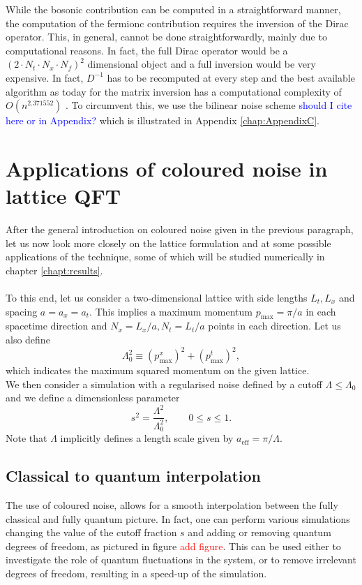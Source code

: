 While the bosonic contribution can be computed in a straightforward manner, the computation of the fermionc contribution requires the inversion of the Dirac operator. This, in general, cannot be done straightforwardly, mainly due to computational reasons.
In fact, the full Dirac operator would be a $(2 \cdot N_t \cdot N_x \cdot N_f)^2$ dimensional object and a full inversion would be very expensive. In fact, $D^{-1}$ has to be recomputed at every step and the best available algorithm as today for the matrix inversion has a computational complexity of $O(n^{2.371552})$ \cite{williams2023new}. To circumvent this, we use the bilinear noise scheme \cite{bilinearnoise1,bilinearnoise2} \textcolor{blue}{should I cite here or in Appendix?} which is illustrated in Appendix \ref{chap:AppendixC}.

\newpage


\section{Applications of coloured noise in lattice QFT}
\label{sec:lattice_with_coloured_noise}
After the general introduction on coloured noise given in the previous paragraph, let us now look more closely on the lattice formulation and at some possible applications of the technique, some of which will be studied numerically in chapter \ref{chapt:results}. \\~\\
To this end, let us consider a two-dimensional lattice with side lengths $L_t, L_x$ and spacing $a = a_x = a_t$. This implies a maximum momentum $p_\text{max} = \pi / a$ in each spacetime direction and $N_x=L_x/a, N_t=L_t/a$ points in each direction. Let us also define 
\begin{equation}
	\Lambda_0^2 \equiv (p^x_\text{max})^2 + (p^t_\text{max})^2,
\end{equation}
which indicates the maximum squared momentum on the given lattice. \\
We then consider a simulation with a regularised noise defined by a cutoff $\Lambda \leq \Lambda_0$ and we define a dimensionless parameter
\begin{equation}
	s^2 = \frac{\Lambda^2}{\Lambda_0^2}, \qquad 0 \leq s \leq 1.
\end{equation}
Note that $\Lambda$ implicitly defines a length scale given by  $a_\text{eff} = \pi/\Lambda$.\\


\subsection{Classical to quantum interpolation}
The use of coloured noise, allows for a smooth interpolation between the fully classical and fully quantum picture. In fact, one can perform various simulations changing the value of the cutoff fraction $s$ and adding or removing quantum degrees of freedom, as pictured in figure \textcolor{red}{add figure}. This can be used either to investigate the role 
of quantum fluctuations in the system, or to remove irrelevant degrees of freedom, resulting in a speed-up of the simulation.

